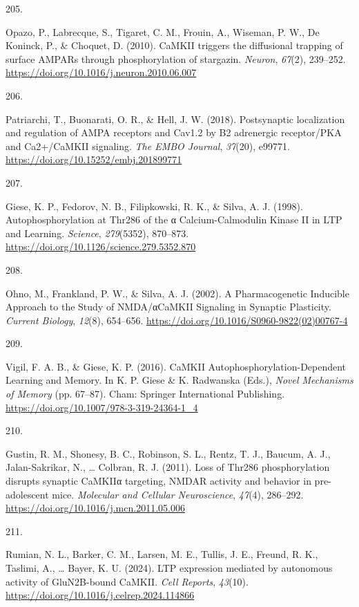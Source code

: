 \documentclass[
  11pt,
  letterpaper,
]{scrreprt}
\newlength{\cslhangindent}
\newlength{\csllabelwidth}
\newenvironment{CSLReferences}[2] %
 {\begin{list}{}{%
  \setlength{\itemindent}{0pt}
  \setlength{\leftmargin}{0pt}
  \setlength{\parsep}{0pt}
  \ifodd #1
   \setlength{\leftmargin}{\cslhangindent}
   \setlength{\itemindent}{-1\cslhangindent}
  \fi
  \setlength{\itemsep}{#2\baselineskip}}}
 {\end{list}}
\newcommand{\CSLLeftMargin}[1]{\parbox[t]{\csllabelwidth}{\strut#1\strut}}
\newcommand{\CSLRightInline}[1]{\parbox[t]{\linewidth - \csllabelwidth}{\strut#1\strut}}
\begin{document}
\begin{CSLReferences}{0}{0}
\CSLLeftMargin{205. }%
\CSLRightInline{Opazo, P., Labrecque, S., Tigaret, C. M., Frouin, A.,
Wiseman, P. W., De Koninck, P., \& Choquet, D. (2010). {CaMKII} triggers
the diffusional trapping of surface {AMPARs} through phosphorylation of
stargazin. \emph{Neuron}, \emph{67}(2), 239--252.
\url{https://doi.org/10.1016/j.neuron.2010.06.007}}

\CSLLeftMargin{206. }%
\CSLRightInline{Patriarchi, T., Buonarati, O. R., \& Hell, J. W. (2018).
Postsynaptic localization and regulation of {AMPA} receptors and
{Cav1}.2 by Β2 adrenergic receptor/{PKA} and {Ca2}+/{CaMKII} signaling.
\emph{The EMBO Journal}, \emph{37}(20), e99771.
\url{https://doi.org/10.15252/embj.201899771}}

\CSLLeftMargin{207. }%
\CSLRightInline{Giese, K. P., Fedorov, N. B., Filipkowski, R. K., \&
Silva, A. J. (1998). Autophosphorylation at {Thr286} of the α
{Calcium-Calmodulin Kinase II} in {LTP} and {Learning}. \emph{Science},
\emph{279}(5352), 870--873.
\url{https://doi.org/10.1126/science.279.5352.870}}

\CSLLeftMargin{208. }%
\CSLRightInline{Ohno, M., Frankland, P. W., \& Silva, A. J. (2002). A
{Pharmacogenetic Inducible Approach} to the {Study} of {NMDA}/{αCaMKII
Signaling} in {Synaptic Plasticity}. \emph{Current Biology},
\emph{12}(8), 654--656.
\url{https://doi.org/10.1016/S0960-9822(02)00767-4}}

\CSLLeftMargin{209. }%
\CSLRightInline{Vigil, F. A. B., \& Giese, K. P. (2016). {CaMKII
Autophosphorylation-Dependent Learning} and {Memory}. In K. P. Giese \&
K. Radwanska (Eds.), \emph{Novel {Mechanisms} of {Memory}} (pp. 67--87).
Cham: Springer International Publishing.
\url{https://doi.org/10.1007/978-3-319-24364-1_4}}

\CSLLeftMargin{210. }%
\CSLRightInline{Gustin, R. M., Shonesy, B. C., Robinson, S. L., Rentz,
T. J., Baucum, A. J., Jalan-Sakrikar, N., \ldots{} Colbran, R. J.
(2011). Loss of {Thr286} phosphorylation disrupts synaptic {CaMKIIα}
targeting, {NMDAR} activity and behavior in pre-adolescent mice.
\emph{Molecular and Cellular Neuroscience}, \emph{47}(4), 286--292.
\url{https://doi.org/10.1016/j.mcn.2011.05.006}}

\CSLLeftMargin{211. }%
\CSLRightInline{Rumian, N. L., Barker, C. M., Larsen, M. E., Tullis, J.
E., Freund, R. K., Taslimi, A., \ldots{} Bayer, K. U. (2024). {LTP}
expression mediated by autonomous activity of {GluN2B-bound CaMKII}.
\emph{Cell Reports}, \emph{43}(10).
\url{https://doi.org/10.1016/j.celrep.2024.114866}}


\end{CSLReferences}
\end{document}
